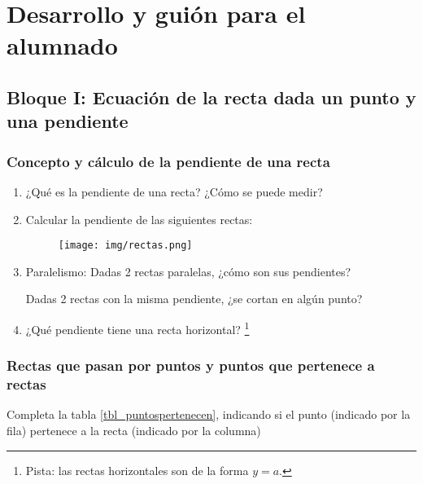 \documentclass[palatino]{apuntesURJC}
\newcommand{\espaciover}[0]{0.7cm}
\begin{document}
\section{Desarrollo y guión para el alumnado}
\newpage

\subsection{Bloque I: Ecuación de la recta dada un punto y una pendiente}

\subsubsection{Concepto y cálculo de la pendiente de una recta}
\begin{enumerate}
	\item ¿Qué es la pendiente de una recta? ¿Cómo se puede medir?
	\vspace{\espaciover}

	\item Calcular la pendiente de las siguientes rectas:

	\begin{figure}[h]
	\centering
	\texttt{[image: img/rectas.png]}
	\end{figure}

	\vspace{\espaciover}

	\item Paralelismo:
	\subitem Dadas 2 rectas paralelas, ¿cómo son sus pendientes?
	\vspace{\espaciover}

	\subitem Dadas 2 rectas con la misma pendiente, ¿se cortan en algún punto?
	\vspace{\espaciover}

	\item ¿Qué pendiente tiene una recta horizontal? \footnote{Pista: las rectas 
	horizontales son de la forma $y=a$.}
	\vspace{\espaciover}

\end{enumerate}


\subsubsection{Rectas que pasan por puntos y puntos que pertenece a rectas}
Completa la tabla \ref{tbl_puntospertenecen}, indicando si el punto (indicado por la fila) pertenece a la recta (indicado por la columna)
\end{document}
